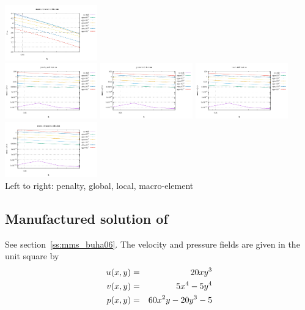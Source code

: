 \begin{center}
\includegraphics[width=4cm]{python_codes/fieldstone_115/results/ldc/prms_macro.pdf}\\
\includegraphics[width=4cm]{python_codes/fieldstone_115/results/ldc/divv_penalty.pdf}
\includegraphics[width=4cm]{python_codes/fieldstone_115/results/ldc/divv_global.pdf}
\includegraphics[width=4cm]{python_codes/fieldstone_115/results/ldc/divv_local.pdf}
\includegraphics[width=4cm]{python_codes/fieldstone_115/results/ldc/divv_macro.pdf}\\
{\captionfont Left to right: penalty, global, local, macro-element}
\end{center}

\newpage
\subsection*{Manufactured solution of \textcite{buha06}}

See section~\ref{ss:mms_buha06}.
The velocity and pressure fields are given in the unit square by
\begin{eqnarray}
u(x,y) &=& 20xy^3 \nonumber\\
v(x,y) &=& 5x^4-5y^4 \nonumber\\
p(x,y) &=& 60x^2y -20y^3 -5
\end{eqnarray}


